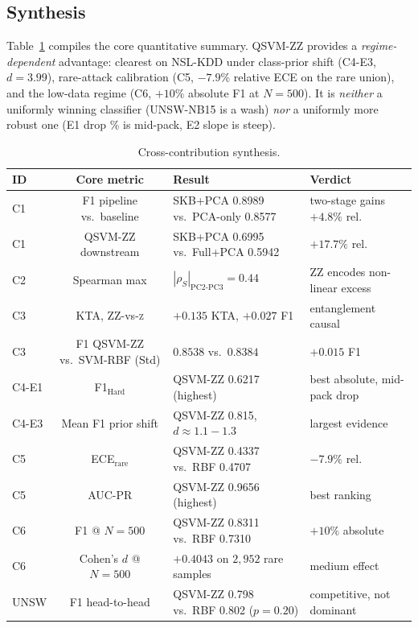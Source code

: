 \documentclass[journal]{IEEEtran}
\newcommand{\ZZ}{\textsc{ZZ}}
\newcommand{\QSVM}{QSVM-\ZZ}
\begin{document}
  \subsection{Synthesis}
  Table~\ref{tab:summary} compiles the core quantitative summary.
  \QSVM{} provides a \emph{regime-dependent} advantage: clearest on
  NSL-KDD under class-prior shift (C4-E3, $d{=}3.99$), rare-attack
  calibration (C5, $-7.9\%$ relative ECE on the rare union), and the
  low-data regime (C6, $+10\%$ absolute F1 at $N{=}500$). It is
  \emph{neither} a uniformly winning classifier (UNSW-NB15 is a wash)
  \emph{nor} a uniformly more robust one (E1 drop \% is mid-pack, E2
  slope is steep).

  \begin{table}[t]
  \centering
  \caption{Cross-contribution synthesis.}
  \label{tab:summary}
  \small
  \begin{tabular}{lcll}
  \toprule
  ID & Core metric & Result & Verdict\\\midrule
  C1 & F1 pipeline vs.\ baseline & SKB+PCA 0.8989 vs.\ PCA-only 0.8577 & two-stage gains $+4.8\%$ rel.\\
  C1 & \QSVM{} downstream & SKB+PCA 0.6995 vs.\ Full+PCA 0.5942 & $+17.7\%$ rel.\\
  C2 & Spearman max & $|\rho_S|_{\text{PC2-PC3}}{=}0.44$ & \ZZ{} encodes non-linear excess\\
  C3 & KTA, \ZZ{}-vs-\textsc{z} & $+0.135$ KTA, $+0.027$ F1 & entanglement causal\\
  C3 & F1 \QSVM{} vs.\ SVM-RBF (Std) & $0.8538$ vs.\ $0.8384$ & $+0.015$ F1\\
  C4-E1 & F1$_{\text{Hard}}$ & \QSVM{} 0.6217 (highest) & best absolute, mid-pack drop\\
  C4-E3 & Mean F1 prior shift & \QSVM{} 0.815, $d{\approx}1.1{-}1.3$ & largest evidence\\
  C5 & ECE$_{\text{rare}}$ & \QSVM{} 0.4337 vs.\ RBF 0.4707 & $-7.9\%$ rel.\\
  C5 & AUC-PR & \QSVM{} 0.9656 (highest) & best ranking\\
  C6 & F1 @ $N{=}500$ & \QSVM{} 0.8311 vs.\ RBF 0.7310 & $+10\%$ absolute\\
  C6 & Cohen's $d$ @ $N{=}500$ & $+0.4043$ on $2{,}952$ rare samples & medium effect\\
  UNSW & F1 head-to-head & \QSVM{} 0.798 vs.\ RBF 0.802 ($p{=}0.20$) & competitive, not dominant\\
  \bottomrule
  \end{tabular}
  \end{table}
\end{document}
